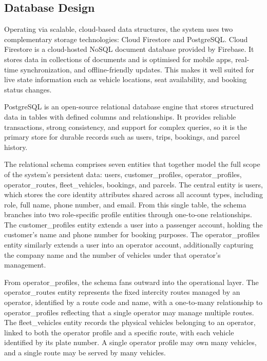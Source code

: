 \subsection{Database Design}

Operating via scalable, cloud-based data structures, the system uses two
complementary storage technologies: Cloud Firestore and PostgreSQL. Cloud
Firestore is a cloud-hosted NoSQL document database provided by Firebase. It
stores data in collections of documents and is optimised for mobile apps,
real-time synchronization, and offline-friendly updates. This makes it well
suited for live state information such as vehicle locations, seat availability,
and booking status changes.

PostgreSQL is an open-source relational database engine that stores structured
data in tables with defined columns and relationships. It provides reliable
transactions, strong consistency, and support for complex queries, so it is the
primary store for durable records such as users, trips, bookings, and parcel
history.

The relational schema comprises seven entities that together model the full
scope of the system's persistent data: users, customer\_profiles,
operator\_profiles, operator\_routes, fleet\_vehicles, bookings, and parcels.
The central entity is users, which stores the core identity attributes shared
across all account types, including role, full name, phone number, and email.
From this single table, the schema branches into two role-specific profile
entities through one-to-one relationships. The customer\_profiles entity extends
a user into a passenger account, holding the customer's name and phone number
for booking purposes. The operator\_profiles entity similarly extends a user
into an operator account, additionally capturing the company name and the number
of vehicles under that operator's management.

From operator\_profiles, the schema fans outward into the operational layer.
The operator\_routes entity represents the fixed intercity routes managed by an
operator, identified by a route code and name, with a one-to-many relationship
to operator\_profiles reflecting that a single operator may manage multiple
routes. The fleet\_vehicles entity records the physical vehicles belonging to an
operator, linked to both the operator profile and a specific route, with each
vehicle identified by its plate number. A single operator profile may own many
vehicles, and a single route may be served by many vehicles.

